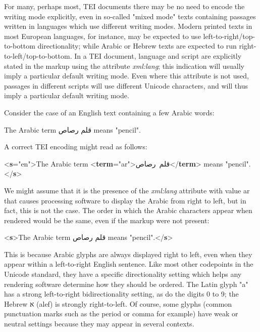 For many, perhaps most, TEI documents there may be no need to encode the writing mode explicitly, even in so-called "mixed mode" texts containing passages written in languages which use different writing modes. Modern printed texts in most European languages, for instance, may be expected to use left-to-right/top-to-bottom directionality; while Arabic or Hebrew texts are expected to run right-to-left/top-to-bottom. In a TEI document, language and script are explicitly stated in the markup using the attribute {\itshape xml:lang}; this indication will usually imply a particular default writing mode. Even where this attribute is not used, passages in different scripts will use different Unicode characters, and will thus imply a particular default writing mode.\par
Consider the case of an English text containing a few Arabic words: \par\hfill\bgroup\exampleFont\vskip 10pt\begin{shaded}
\obeyspaces The Arabic term قلم رصاص means "pencil".\end{shaded}
\par\egroup 
 A correct TEI encoding might read as follows: \par\bgroup{}\exampleFont \begin{shaded}\noindent\mbox{}{<\textbf{s}\hspace*{1em}{xml:lang}="{en}">}The Arabic term\mbox{}\newline 
{<\textbf{term}\hspace*{1em}{xml:lang}="{ar}">}\hbox{قلم رصاص}{</\textbf{term}>} means "pencil".{</\textbf{s}>}\end{shaded}\egroup\par \noindent  We might assume that it is the presence of the {\itshape xml:lang} attribute with value ar that causes processing software to display the Arabic from right to left, but in fact, this is not the case. The order in which the Arabic characters appear when rendered would be the same, even if the markup were not present: \par\bgroup{}\exampleFont \begin{shaded}\noindent\mbox{}{<\textbf{s}>}The Arabic term قلم رصاص means "pencil".{</\textbf{s}>}\end{shaded}\egroup\par \noindent  This is because Arabic glyphs are always displayed right to left, even when they appear within a left-to-right English sentence. Like most other codepoints in the Unicode standard, they have a specific directionality setting which helps any rendering software determine how they should be ordered. The Latin glyph "a" has a strong left-to-right bidirectionality setting, as do the digits 0 to 9; the Hebrew א (alef) is strongly right-to-left. Of course, some glyphs (common punctuation marks such as the period or comma for example) have weak or neutral settings because they may appear in several contexts.\par
